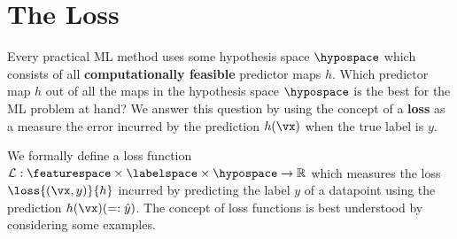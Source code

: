 \documentclass[12pt]{report}
\begin{document}

\section{The Loss}
\label{sec_lossfct}

Every practical ML method uses some hypothesis space $\hypospace$ 
which consists of all {\bf computationally feasible} predictor maps $h$. 
Which predictor map $h$ out of all the maps in the hypothesis space 
$\hypospace$ is the best for the ML problem at hand? We answer this 
question by using the concept of a {\bf loss} as a measure the error  
incurred by the prediction $h(\vx)$ when the true label is $y$. 

We formally define a loss function $\mathcal{L}: \featurespace \times \labelspace \times \hypospace \rightarrow \mathbb{R}$ 
which measures the loss $\loss{(\vx,y)}{h}$ incurred by predicting the 
label $y$ of a datapoint using the prediction $h(\vx)(=: \hat{y})$. 
The concept of loss functions is best understood by considering 
some examples. 
\end{document}
